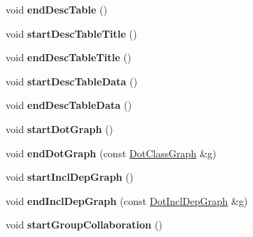 \begin{DoxyCompactItemize}
\item 
\hypertarget{class_html_generator_aea3e3db6190b6ec4e0f5c3988cacb40c}{void {\bfseries end\-Desc\-Table} ()}\label{class_html_generator_aea3e3db6190b6ec4e0f5c3988cacb40c}

\item 
\hypertarget{class_html_generator_a5ab1218802d388186a056cba7ea439e2}{void {\bfseries start\-Desc\-Table\-Title} ()}\label{class_html_generator_a5ab1218802d388186a056cba7ea439e2}

\item 
\hypertarget{class_html_generator_a25c810f32509fa5a79d86d96a3d4a275}{void {\bfseries end\-Desc\-Table\-Title} ()}\label{class_html_generator_a25c810f32509fa5a79d86d96a3d4a275}

\item 
\hypertarget{class_html_generator_ade74ab43d9c69e30b4344e7d176bd07e}{void {\bfseries start\-Desc\-Table\-Data} ()}\label{class_html_generator_ade74ab43d9c69e30b4344e7d176bd07e}

\item 
\hypertarget{class_html_generator_aba60999e7c19eb5c546be43e157de98d}{void {\bfseries end\-Desc\-Table\-Data} ()}\label{class_html_generator_aba60999e7c19eb5c546be43e157de98d}

\item 
\hypertarget{class_html_generator_a3ea98cf1d0374587532fd534eb207de3}{void {\bfseries start\-Dot\-Graph} ()}\label{class_html_generator_a3ea98cf1d0374587532fd534eb207de3}

\item 
\hypertarget{class_html_generator_a823fd139095f21ebf78ec23a90cb7a24}{void {\bfseries end\-Dot\-Graph} (const \hyperlink{class_dot_class_graph}{Dot\-Class\-Graph} \&g)}\label{class_html_generator_a823fd139095f21ebf78ec23a90cb7a24}

\item 
\hypertarget{class_html_generator_a94461be722782868a8ecb74a7fe44a35}{void {\bfseries start\-Incl\-Dep\-Graph} ()}\label{class_html_generator_a94461be722782868a8ecb74a7fe44a35}

\item 
\hypertarget{class_html_generator_af66232045963e5255faf33c600fb1be3}{void {\bfseries end\-Incl\-Dep\-Graph} (const \hyperlink{class_dot_incl_dep_graph}{Dot\-Incl\-Dep\-Graph} \&g)}\label{class_html_generator_af66232045963e5255faf33c600fb1be3}

\item 
\hypertarget{class_html_generator_ac75e421f535cd69ad8b286bb5682f98a}{void {\bfseries start\-Group\-Collaboration} ()}\label{class_html_generator_ac75e421f535cd69ad8b286bb5682f98a}


\end{DoxyCompactItemize}
